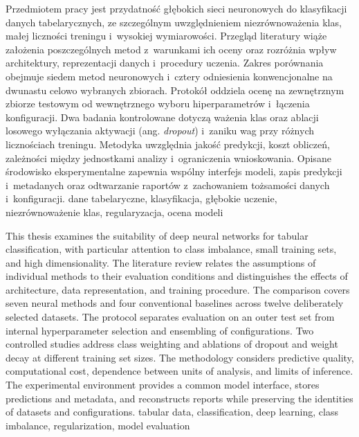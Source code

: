 \begin{singlespace}
\fontsize{12}{14.4}\selectfont
\abstract
Przedmiotem pracy jest przydatność głębokich sieci neuronowych do klasyfikacji danych tabelarycznych, ze szczególnym uwzględnieniem niezrównoważenia klas, małej liczności treningu i~wysokiej wymiarowości. Przegląd literatury wiąże założenia poszczególnych metod z~warunkami ich oceny oraz rozróżnia wpływ architektury, reprezentacji danych i~procedury uczenia. Zakres porównania obejmuje siedem metod neuronowych i~cztery odniesienia konwencjonalne na dwunastu celowo wybranych zbiorach. Protokół oddziela ocenę na zewnętrznym zbiorze testowym od wewnętrznego wyboru hiperparametrów i~łączenia konfiguracji. Dwa badania kontrolowane dotyczą ważenia klas oraz ablacji losowego wyłączania aktywacji (ang. \textit{dropout}) i~zaniku wag przy różnych licznościach treningu. Metodyka uwzględnia jakość predykcji, koszt obliczeń, zależności między jednostkami analizy i~ograniczenia wnioskowania. Opisane środowisko eksperymentalne zapewnia wspólny interfejs modeli, zapis predykcji i~metadanych oraz odtwarzanie raportów z~zachowaniem tożsamości danych i~konfiguracji.
\keywords dane tabelaryczne, klasyfikacja, głębokie uczenie, niezrównoważenie klas, regularyzacja, ocena modeli
\end{singlespace}

\clearpage
\begin{singlespace}
\fontsize{12}{14.4}\selectfont
\secondabstract
This thesis examines the suitability of deep neural networks for tabular classification, with particular attention to class imbalance, small training sets, and high dimensionality. The literature review relates the assumptions of individual methods to their evaluation conditions and distinguishes the effects of architecture, data representation, and training procedure. The comparison covers seven neural methods and four conventional baselines across twelve deliberately selected datasets. The protocol separates evaluation on an outer test set from internal hyperparameter selection and ensembling of configurations. Two controlled studies address class weighting and ablations of dropout and weight decay at different training set sizes. The methodology considers predictive quality, computational cost, dependence between units of analysis, and limits of inference. The experimental environment provides a common model interface, stores predictions and metadata, and reconstructs reports while preserving the identities of datasets and configurations.
\secondkeywords tabular data, classification, deep learning, class imbalance, regularization, model evaluation
\end{singlespace}
